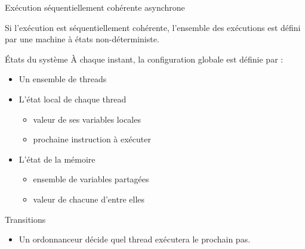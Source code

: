 
\begingroup

\begin{frame}{Exécution séquentiellement cohérente asynchrone}
  
  Si l'exécution est séquentiellement cohérente, l'ensemble des exécutions est défini par une machine à états non-déterministe.

  \begin{block}{États du système}
    À chaque instant, la \alert{configuration globale} est définie par :
    \begin{itemize}
    \item Un ensemble de threads
    \item L'état local de chaque thread
      \begin{itemize}
      \item valeur de ses variables locales
      \item prochaine instruction à exécuter
      \end{itemize}
    \item L'état de la mémoire
      \begin{itemize}
      \item ensemble de variables partagées
      \item valeur de chacune d'entre elles
      \end{itemize}
    \end{itemize}
  \end{block}

  \begin{block}{Transitions}
    \begin{itemize}
    \item Un \alert{ordonnanceur} décide quel thread exécutera le prochain pas.
    \end{itemize}
  \end{block}

\end{frame}

\endgroup
\endinput
